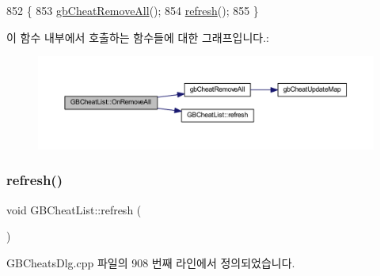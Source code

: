 \begin{DoxyCode}
852 \{
853   \mbox{\hyperlink{gb_cheats_8cpp_aac0eadde26bcba9cbe5ff2f0fa71ee23}{gbCheatRemoveAll}}();
854   \mbox{\hyperlink{class_g_b_cheat_list_a248cc28fa5e392d2f55d0f66ff6c5821}{refresh}}();
855 \}
\end{DoxyCode}
이 함수 내부에서 호출하는 함수들에 대한 그래프입니다.\+:
\nopagebreak
\begin{figure}[H]
\begin{center}
\leavevmode
\includegraphics[width=350pt]{class_g_b_cheat_list_a572e8d726efb4dcaed99de7b7f1a815d_cgraph}
\end{center}
\end{figure}
\mbox{\label{class_g_b_cheat_list_a248cc28fa5e392d2f55d0f66ff6c5821}} 
\subsubsection{\texorpdfstring{refresh()}{refresh()}}
{\footnotesize\ttfamily void G\+B\+Cheat\+List\+::refresh (\begin{DoxyParamCaption}{ }\end{DoxyParamCaption})}



G\+B\+Cheats\+Dlg.\+cpp 파일의 908 번째 라인에서 정의되었습니다.


